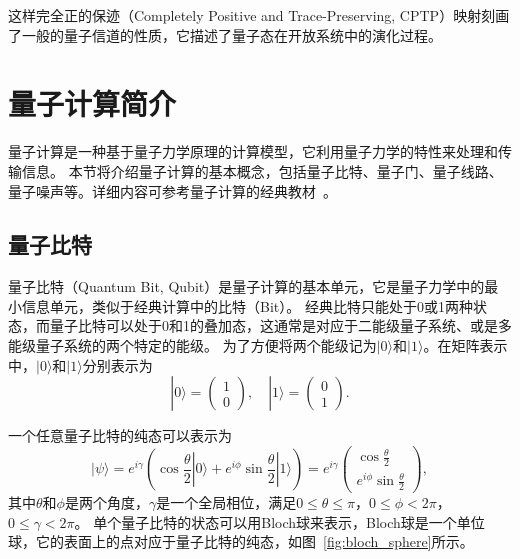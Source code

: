 这样完全正的保迹（Completely Positive and Trace-Preserving, CPTP）映射刻画了一般的量子信道的性质，它描述了量子态在开放系统中的演化过程。


\section{量子计算简介}

量子计算是一种基于量子力学原理的计算模型，它利用量子力学的特性来处理和传输信息。
本节将介绍量子计算的基本概念，包括量子比特、量子门、量子线路、量子噪声等。详细内容可参考量子计算的经典教材~\cite{nielsen2001quantum}。

\subsection{量子比特}
量子比特（Quantum Bit, Qubit）是量子计算的基本单元，它是量子力学中的最小信息单元，类似于经典计算中的比特（Bit）。
经典比特只能处于0或1两种状态，而量子比特可以处于0和1的叠加态，这通常是对应于二能级量子系统、或是多能级量子系统的两个特定的能级。
为了方便将两个能级记为$|0\rangle$和$|1\rangle$。在矩阵表示中，$|0\rangle$和$|1\rangle$分别表示为
\begin{equation}
    |0\rangle = \begin{pmatrix} 1 \\ 0 \end{pmatrix}, \quad |1\rangle = \begin{pmatrix} 0 \\ 1 \end{pmatrix}.
\end{equation}

一个任意量子比特的纯态可以表示为
\begin{equation}
    |\psi\rangle = e^{i\gamma}(\cos\frac{\theta}{2}|0\rangle + e^{i\phi}\sin\frac{\theta}{2}|1\rangle)=e^{i\gamma}\begin{pmatrix}
        \cos\frac{\theta}{2} \\ e^{i\phi}\sin\frac{\theta}{2}
    \end{pmatrix},
\end{equation}
其中$\theta$和$\phi$是两个角度，$\gamma$是一个全局相位，满足$0 \leq \theta \leq \pi$，$0 \leq \phi < 2\pi$，$0 \leq \gamma < 2\pi$。 单个量子比特的状态可以用Bloch球来表示，Bloch球是一个单位球，它的表面上的点对应于量子比特的纯态，如图~\ref{fig:bloch_sphere}所示。



